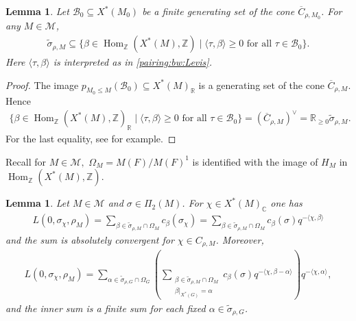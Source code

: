 \documentclass[10pt]{amsart}
\newtheorem{lemma}[theorem]{Lemma}
\theoremstyle{definition}
\numberwithin{equation}{section}
\DeclareMathOperator{\Hom}{\mathrm{Hom}}
\numberwithin{equation}{subsection}
\newcommand{\ZZ}{\mathbb{Z}}
\newcommand{\RR}{\mathbb{R}}
\newcommand{\CC}{\mathbb{C}}
\begin{document}
\begin{lemma}\label{Lcone:dualdual} Let $\mathcal{B}_0\subseteq X^*(M_0)$ be a finite generating set of the cone $\overline{C}_{\rho,M_0}$. For any $M\in \mathcal{M}$,
\begin{align*}
    \widetilde{\sigma}_{\rho,M} \subseteq \{\beta\in\Hom_\ZZ(X^*(M),\ZZ)\mid \langle\tau,\beta\rangle\geq 0\text{ for all }\tau\in\mathcal{B}_0\}.
\end{align*}
Here $\langle\tau,\beta\rangle$ is interpreted as in \eqref{pairing:bw:Levis}.
\end{lemma}
\begin{proof} The image $p_{M_0\leq M}(\mathcal{B}_0)\subseteq X^*(M)_\RR$ is a generating set of the cone $\overline{C}_{\rho,M}$. Hence
\begin{align*}
    \{\beta\in\Hom_\ZZ(X^*(M),\ZZ)_\RR\mid \langle\tau,\beta\rangle\geq 0\text{ for all }\tau\in\mathcal{B}_0\} = (\overline{C}_{\rho,M})^\vee = \mathbb{R}_{\geq 0}\widetilde{\sigma}_{\rho,M}.
\end{align*}
For the last equality, see \cite[p.9 (1)]{Fulton:toric} for example. 
\end{proof}

Recall for $M\in \mathcal{M},$ $\Omega_M=M(F)/M(F)^1$ is identified with the image of $H_M$ in $\Hom_\ZZ(X^\ast(M),\ZZ).$

\begin{lemma}\label{Lfunction:expand:cone} Let $M\in \mathcal{M}$ and $\sigma\in \Pi_2(M)$. For $\chi\in X^*(M)_\CC$ one has
\begin{align*}
    L(0,\sigma_\chi,\rho_M) = \sum_{\beta\in\widetilde{\sigma}_{\rho,M}\cap \Omega_M}c_\beta(\sigma_\chi) = \sum_{\beta\in\widetilde{\sigma}_{\rho,M}\cap \Omega_M}c_\beta(\sigma) q^{-\langle\chi,\beta\rangle}
\end{align*}
and the sum is absolutely convergent for $\chi\in C_{\rho,M}$. Moreover, 
\begin{align*}
    L(0,\sigma_\chi,\rho_M) = \sum_{\alpha\in\widetilde{\sigma}_{\rho,G}\cap \Omega_G}\left(\sum_{\substack{\beta\in\widetilde{\sigma}_{\rho,M}\cap \Omega_M\\\beta\vert_{X^*(G)} = \alpha}}c_{\beta}(\sigma)q^{-\langle \chi,\beta-\alpha\rangle}\right)q^{-\langle\chi,\alpha\rangle},
\end{align*}
and the inner sum is a finite sum for each fixed $\alpha\in\widetilde{\sigma}_{\rho,G}$.
\end{lemma}
\end{document}
